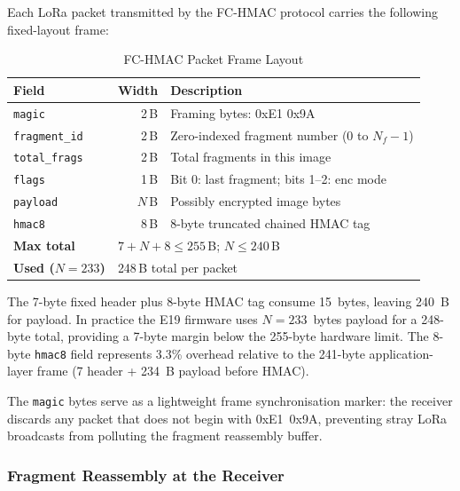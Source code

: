 \documentclass[journal]{IEEEtran}
\begin{document}
Each LoRa packet transmitted by the FC-HMAC protocol carries the following
fixed-layout frame:

\begin{table}[ht]
\centering
\caption{FC-HMAC Packet Frame Layout}
\label{tab:pkt_format}
\begin{tabular}{lrp{4.5cm}}
\toprule
Field & Width & Description \\
\midrule
\texttt{magic}        & 2\,B & Framing bytes: 0xE1 0x9A \\
\texttt{fragment\_id} & 2\,B & Zero-indexed fragment number (0 to $N_f{-}1$) \\
\texttt{total\_frags} & 2\,B & Total fragments in this image \\
\texttt{flags}        & 1\,B & Bit 0: last fragment; bits 1--2: enc mode \\
\texttt{payload}      & $N$\,B & Possibly encrypted image bytes \\
\texttt{hmac8}        & 8\,B & 8-byte truncated chained HMAC tag \\
\midrule
\textbf{Max total}    & \multicolumn{2}{l}{$7 + N + 8 \leq 255$\,B; $N \leq 240$\,B} \\
\textbf{Used ($N=233$)} & \multicolumn{2}{l}{248\,B total per packet} \\
\bottomrule
\end{tabular}
\end{table}

The 7-byte fixed header plus 8-byte HMAC tag consume 15~bytes, leaving 240~B
for payload.  In practice the E19 firmware uses $N = 233$~bytes payload for
a 248-byte total, providing a 7-byte margin below the 255-byte hardware limit.
The 8-byte \texttt{hmac8} field represents 3.3\% overhead relative to the
241-byte application-layer frame (7 header + 234~B payload before HMAC).

The \texttt{magic} bytes serve as a lightweight frame synchronisation marker:
the receiver discards any packet that does not begin with 0xE1~0x9A, preventing
stray LoRa broadcasts from polluting the fragment reassembly buffer.

\subsubsection{Fragment Reassembly at the Receiver}
\end{document}
